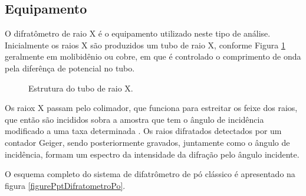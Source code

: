 \subsection{Equipamento}

O difratômetro de raio X é o equipamento utilizado neste tipo de análise.
Inicialmente os raios X são produzidos um tubo de raio X,
conforme Figura \ref{figureXRayTube} geralmente em molibidênio ou cobre, 
em que é controlado o comprimento de onda pela diferênça de potencial no
tubo. 

\begin{figure}[ht]
    \center
    \begin{minipage}{12cm}
     \caption{Estrutura do tubo de raio X.}\label{figureXRayTube} 
     \end{minipage}
\end{figure}

Os raiox X passam pelo colimador, que funciona para estreitar os feixe dos raios,
que então são incididos sobra a amostra que tem o ângulo de incidência
modificado a uma taxa determinada \cite{bookMaterialsCharacterizationYang}.
Os raios difratados detectados por um contador Geiger, sendo posteriormente gravados,
juntamente como o ângulo de incidência, formam um espectro da intensidade da difração
pelo ângulo incidente.

O esquema completo do sistema de difatrômetro de pó clássico é apresentado
na figura \ref{figurePptDifratometroPo}.

